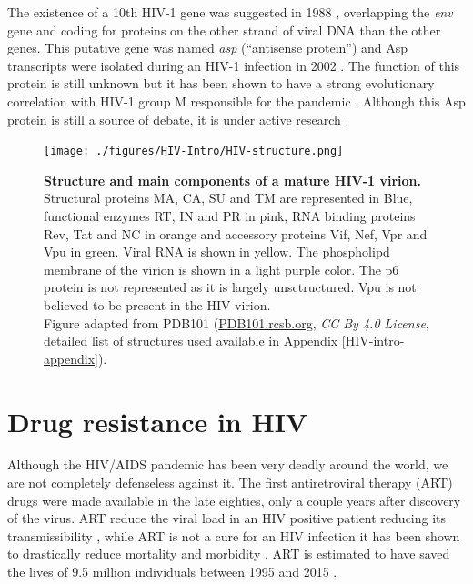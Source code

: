 \documentclass[
  11pt,
  twoside,
  BCOR=10mm,
  listof=totoc]{scrbook}
\newcommand{\extcaption}[2]{
    \caption[#1]{
        \textbf{#1}\newline
        #2
    }
}
\begin{document}
The existence of a 10th HIV-1 gene was suggested in 1988 \autocite{millerHumanImmunodeficiencyVirus1988}, overlapping the \emph{env} gene and coding for proteins on the other strand of viral DNA than the other genes. This putative gene was named \emph{asp} (``antisense protein'') and Asp transcripts were isolated during an HIV-1 infection in 2002 \autocite{briquetImmunolocalizationStudiesAntisense2002}. The function of this protein is still unknown but it has been shown to have a strong evolutionary correlation with HIV-1 group M responsible for the pandemic \autocite{cassanConcomitantEmergenceAntisense2016}. Although this Asp protein is still a source of debate, it is under active research \autocite{savoretPilotStudyHumoral2020}.

\begin{figure}
  \centering
  \texttt{[image: ./figures/HIV-Intro/HIV-structure.png]}
  \extcaption{Structure and main components of a mature HIV-1 virion.}{Structural proteins MA, CA, SU and TM are represented in Blue, functional enzymes RT, IN and PR in pink, RNA binding proteins Rev, Tat and NC in orange and accessory proteins Vif, Nef, Vpr and Vpu in green. Viral RNA is shown in yellow. The phospholipd membrane of the virion is shown in a light purple color. The p6 protein is not represented as it is largely unsctructured. Vpu is not believed to be present in the HIV virion. \\
Figure adapted from PDB101 \autocite{zardecki2022} (\href{https://PDB101.rcsb.org}{PDB101.rcsb.org}, \textit{CC By 4.0 License}, detailed list of structures used available in Appendix \autoref{HIV-intro-appendix}).}
\label{fig:hivStructure}
\end{figure}

\hypertarget{drug-resistance-in-hiv}{%
\section{Drug resistance in HIV}\label{drug-resistance-in-hiv}}

Although the HIV/AIDS pandemic has been very deadly around the world, we are not completely defenseless against it. The first antiretroviral therapy (ART) drugs were made available in the late eighties, only a couple years after discovery of the virus. ART reduce the viral load in an HIV positive patient reducing its transmissibility \autocite{eisingerHIVViralLoad2019}, while ART is not a cure for an HIV infection it has been shown to drastically reduce mortality and morbidity \autocite{palellaDecliningMorbidityMortality1998}. ART is estimated to have saved the lives of 9.5 million individuals between 1995 and 2015 \autocite{forsytheTwentyYearsAntiretroviral2019}.
\end{document}
